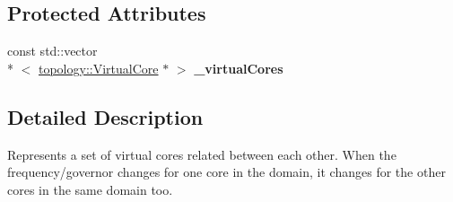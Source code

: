 \subsection*{Protected Attributes}
\begin{DoxyCompactItemize}
\item 
\hypertarget{classmammut_1_1cpufreq_1_1Domain_ae71a3d8c629d75fab1a6cf313e445d3c}{const std\-::vector\\*
$<$ \hyperlink{classmammut_1_1topology_1_1VirtualCore}{topology\-::\-Virtual\-Core} $\ast$ $>$ {\bfseries \-\_\-virtual\-Cores}}\label{classmammut_1_1cpufreq_1_1Domain_ae71a3d8c629d75fab1a6cf313e445d3c}

\end{DoxyCompactItemize}


\subsection{Detailed Description}
Represents a set of virtual cores related between each other. When the frequency/governor changes for one core in the domain, it changes for the other cores in the same domain too. 

